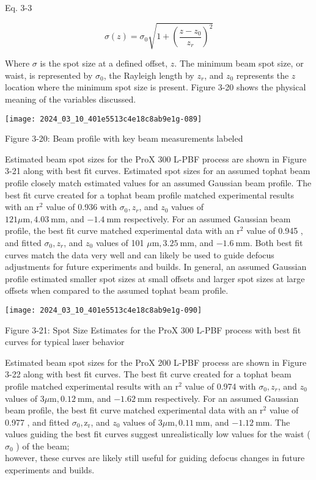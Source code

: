 \documentclass[10pt]{article}
\begin{document}
Eq. 3-3

$$
\sigma(z)=\sigma_{0} \sqrt{1+\left(\frac{z-z_{0}}{z_{r}}\right)^{2}}
$$

Where $\sigma$ is the spot size at a defined offset, $z$. The minimum beam spot size, or waist, is represented by $\sigma_{0}$, the Rayleigh length by $z_{r}$, and $z_{0}$ represents the $z$ location where the minimum spot size is present. Figure 3-20 shows the physical meaning of the variables discussed.

\begin{center}
\texttt{[image: 2024\_03\_10\_401e5513c4e18c8ab9e1g-089]}
\end{center}

Figure 3-20: Beam profile with key beam measurements labeled

Estimated beam spot sizes for the ProX 300 L-PBF process are shown in Figure 3-21 along with best fit curves. Estimated spot sizes for an assumed tophat beam profile closely match estimated values for an assumed Gaussian beam profile. The best fit curve created for a tophat beam profile matched experimental results with an $\mathrm{r}^{2}$ value of 0.936 with $\sigma_{0}, z_{r}$, and $z_{0}$ values of\\
$121 \mu \mathrm{m}, 4.03 \mathrm{~mm}$, and $-1.4 \mathrm{~mm}$ respectively. For an assumed Gaussian beam profile, the best fit curve matched experimental data with an $\mathrm{r}^{2}$ value of 0.945 , and fitted $\sigma_{0}, z_{r}$, and $z_{0}$ values of 101 $\mu \mathrm{m}, 3.25 \mathrm{~mm}$, and $-1.6 \mathrm{~mm}$. Both best fit curves match the data very well and can likely be used to guide defocus adjustments for future experiments and builds. In general, an assumed Gaussian profile estimated smaller spot sizes at small offsets and larger spot sizes at large offsets when compared to the assumed tophat beam profile.

\begin{center}
\texttt{[image: 2024\_03\_10\_401e5513c4e18c8ab9e1g-090]}
\end{center}

Figure 3-21: Spot Size Estimates for the ProX 300 L-PBF process with best fit curves for typical laser behavior

Estimated beam spot sizes for the ProX 200 L-PBF process are shown in Figure 3-22 along with best fit curves. The best fit curve created for a tophat beam profile matched experimental results with an $\mathrm{r}^{2}$ value of 0.974 with $\sigma_{0}, z_{r}$, and $z_{0}$ values of $3 \mu \mathrm{m}, 0.12 \mathrm{~mm}$, and $-1.62 \mathrm{~mm}$ respectively. For an assumed Gaussian beam profile, the best fit curve matched experimental data with an $\mathrm{r}^{2}$ value of 0.977 , and fitted $\sigma_{0}, \mathrm{z}_{\mathrm{r}}$, and $z_{0}$ values of $3 \mu \mathrm{m}, 0.11 \mathrm{~mm}$, and $-1.12 \mathrm{~mm}$. The values guiding the best fit curves suggest unrealistically low values for the waist ( $\sigma_{0}$ ) of the beam;\\
however, these curves are likely still useful for guiding defocus changes in future experiments and builds.
\end{document}
